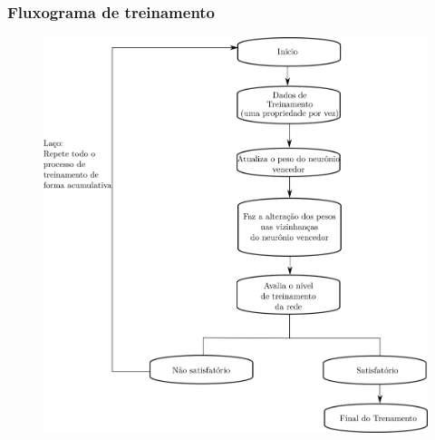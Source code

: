 \documentclass[aspectratio=10]{beamer} %
\begin{document}
\begin{frame}
	\frametitle{Fluxograma de treinamento}
	\begin{scriptsize}
		
		
		\begin{figure}[H]
			\centering
			
			\includegraphics[scale=0.35]{Imagens/treinamento.png}
		\end{figure}
	\end{scriptsize}
\end{frame}
\end{document}
